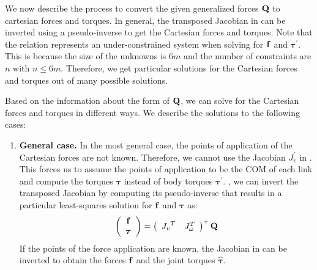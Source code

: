 We now describe the process to convert the given generalized forces $\mathbf{Q}$ to cartesian forces and torques. In general, the transposed Jacobian in  can be inverted using a pseudo-inverse to get the Cartesian forces and torques. Note that the relation represents an under-constrained system when solving for $\mathbf{f}$ and $\bm{\tau}^{'}$. This is because the size of the unknowns is $6m$ and the number of constraints are $n$ with $n\le 6m$. Therefore, we get particular solutions for the Cartesian forces and torques out of many possible solutions.

Based on the information about the form of $\mathbf{Q}$, we can solve for the Cartesian forces and torques in different ways. We describe the solutions to the following cases:
\begin{enumerate}
\item \textbf{General case. } In the most general case, the points of application of the Cartesian forces are not known. Therefore, we cannot use the Jacobian $J_{v}^{'}$ in . This forces us to assume the points of application to be the COM of each link and compute the torques $\bm{\tau}$ instead of body torques $\bm{\tau}^{'}$. \ie, we can invert the transposed Jacobian by computing its pseudo-inverse that results in a particular least-squares solution for $\mathbf{f}$ and $\bm{\tau}$ as:
\begin{equation}
\left (
\begin{array}{c}
\mathbf{f} \\
\bm{\tau}
\end{array}
\right ) = \left (
\begin{array}{cc}
{J_{v}}^T & {J}_\omega^T
\end{array}
\right )^+ \mathbf{Q}
\end{equation}
If the points of the force application are known, the Jacobian in  can be inverted to obtain the forces $\mathbf{f}$ and the joint torques $\hat{\bm{\tau}}$.


\end{enumerate}
